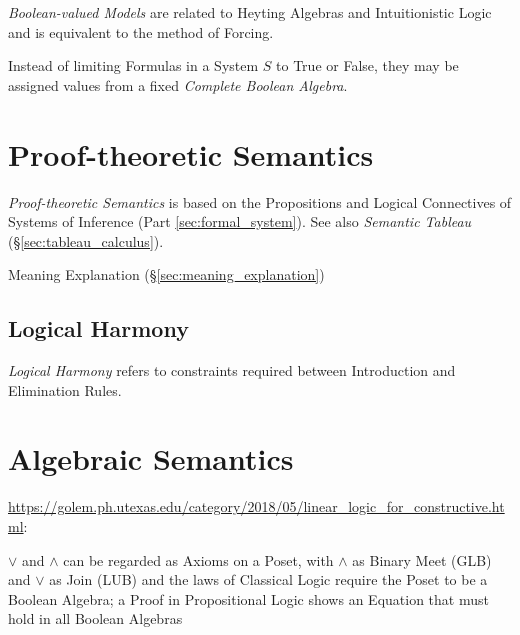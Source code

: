 \emph{Boolean-valued Models} are related to Heyting Algebras and
Intuitionistic Logic and is equivalent to the method of Forcing.

Instead of limiting Formulas in a System $S$ to True or False, they
may be assigned values from a fixed \emph{Complete Boolean Algebra}.



\section{Proof-theoretic Semantics}\label{sec:proof_semantics}

\emph{Proof-theoretic Semantics} is based on the Propositions and
Logical Connectives of Systems of Inference (Part
\ref{sec:formal_system}). See also \emph{Semantic Tableau}
(\S\ref{sec:tableau_calculus}).

Meaning Explanation (\S\ref{sec:meaning_explanation})



\subsection{Logical Harmony} \label{sec:logical_harmony}

\emph{Logical Harmony} refers to constraints required between
Introduction and Elimination Rules.



\section{Algebraic Semantics}\label{sec:algebraic_semantics}

\url{https://golem.ph.utexas.edu/category/2018/05/linear_logic_for_constructive.html}:

$\vee$ and $\wedge$ can be regarded as Axioms on a Poset, with $\wedge$ as
Binary Meet (GLB) and $\vee$ as Join (LUB) and the laws of Classical Logic
require the Poset to be a Boolean Algebra; a Proof in Propositional Logic shows
an Equation that must hold in all Boolean Algebras

